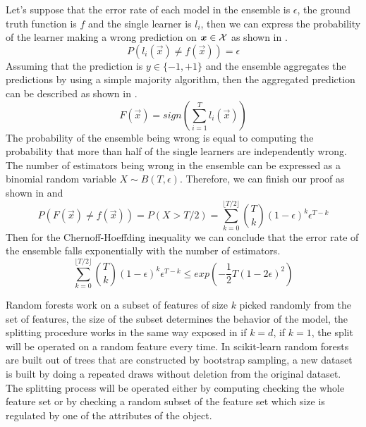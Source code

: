 Let's suppose that the error rate of each model in the ensemble is $\epsilon$, the ground truth
function is $f$ and the single learner is $l_i$, then we can express the probability of the learner
making a wrong prediction on $\boldsymbol{x} \in \mathcal{X}$ as shown in .
\begin{equation}
	\label{eq:error-rate}
	P(l_i(\vec{x}) \neq f(\vec{x})) = \epsilon
\end{equation}
Assuming that the prediction is $y \in \{-1, +1\}$ and the ensemble aggregates the predictions by
using a simple majority algorithm, then the aggregated prediction can be described as shown in
.
\begin{equation}
	\label{eq:ensemble-aggregation}
	F(\vec{x}) = sign\left(\sum_{i = 1}^{T}l_i(\vec{x})\right)
\end{equation}
The probability of the ensemble being wrong is equal to computing the probability that more than
half of the single learners are independently wrong. The number of estimators being wrong in the
ensemble can be expressed as a binomial random variable $X \sim B(T, \epsilon)$. Therefore, we can finish our proof as shown in  and 
\begin{equation}
	\label{eq:binomial}
	P(F(\vec{x}) \neq f(\vec{x})) = P(X > T / 2) = \sum_{k = 0}^{\lfloor T / 2 \rfloor}\binom{T}{k} (1 -
	\epsilon)^k\epsilon^{T - k}
\end{equation}
Then for the Chernoff-Hoeffding inequality we can conclude that the error rate of the ensemble falls
exponentially with the number of estimators.
\begin{equation}
	\label{eq:hoeffding}
	\sum_{k = 0}^{\lfloor T / 2 \rfloor}\binom{T}{k} (1 - \epsilon)^k\epsilon^{T - k} \leq
	exp\left(-\frac{1}{2}T(1 - 2\epsilon)^2\right)
\end{equation}

Random forests work on a subset of features of size $k$ picked randomly from the set of features,
the size of the subset determines the behavior of the model, the splitting procedure works in the
same way exposed in  if $k = d$, if $k = 1$, the split will be operated on a random
feature every time. In scikit-learn random forests are built out of trees that are constructed by
bootstrap sampling, a new dataset is built by doing a repeated draws without deletion from the
original dataset. The splitting process will be operated either by computing checking the whole
feature set or by checking a random subset of the feature set which size is regulated by one of the
attributes of the object.

